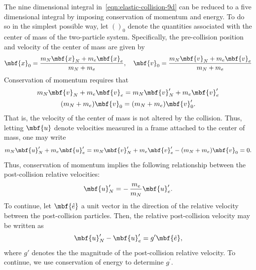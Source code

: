 The nine dimensional integral in~\eqref{eqn:elastic-collision-9d} can
be reduced to a five dimensional integral by imposing conservation of
momentum and energy.  To do so in the simplest possible way, let
$()_0$ denote the quantities associated with the center of mass of the
two-particle system.  Specifically, the pre-collision position and
velocity of the center of mass are given by
%
\begin{equation*}
\mbf{x}_0 = \frac{m_N \mbf{x}_N + m_e \mbf{x}_e}{m_N + m_e},
\quad
\mbf{v}_0 = \frac{m_N \mbf{v}_N + m_e \mbf{v}_e}{m_N + m_e}
\end{equation*}
%
Conservation of momentum requires that
%
\begin{gather*}
m_N \mbf{v}_N + m_e \mbf{v}_e = m_N \mbf{v}_N^{\prime} + m_e \mbf{v}_e^{\prime}\\
(m_N +m_e) \mbf{v}_0 = (m_N + m_e) \mbf{v}_0^{\prime}.
\end{gather*}
%
That is, the velocity of the center of mass is not altered by the
collision.  Thus, letting $\mbf{u}$ denote velocities measured in a
frame attached to the center of mass, one may write
%
\begin{equation*}
m_N \mbf{u}_N^{\prime} + m_e \mbf{u}_e^{\prime}
=
m_N \mbf{v}_N^{\prime} + m_e \mbf{v}_e^{\prime} - (m_N + m_e) \mbf{v}_0
= 0.
\end{equation*}
%
Thus, conservation of momentum implies the following relationship
between the post-collision relative velocities:
%
\begin{equation*}
\mbf{u}_N^{\prime} = -\,\frac{m_e}{m_N} \mbf{u}_e^{\prime}.
\end{equation*}
%
To continue, let $\mbf{\hat{e}}$ a unit vector in the direction of the
relative velocity between the post-collision particles.  Then, the
relative post-collision velocity may be written as
%
\begin{equation*}
\mbf{u}_N^{\prime} - \mbf{u}_e^{\prime} = g^{\prime} \mbf{\hat{e}},
\end{equation*}
%
where $g'$ denotes the the magnitude of the post-collision relative
velocity.  To continue, we use conservation of energy to determine
$g^{\prime}$.

